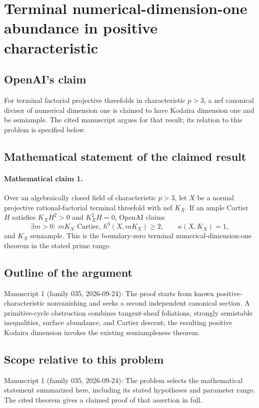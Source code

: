 \documentclass[11pt]{article}
\begin{document}
\section*{Terminal numerical-dimension-one abundance in positive characteristic}

\subsection{OpenAI's claim}
For terminal factorial projective threefolds in characteristic $p>3$, a nef canonical divisor of numerical dimension one is claimed to have Kodaira dimension one and be semiample. The cited manuscript argues for that result; its relation to this problem is specified below.

\subsection{Mathematical statement of the claimed result}
\paragraph{Mathematical claim 1.} Over an algebraically closed field of characteristic $p>3$, let $X$ be a normal projective rational-factorial terminal threefold with nef $K_X$. If an ample Cartier $H$ satisfies $K_XH^2>0$ and $K_X^2H=0$, OpenAI claims
\[
\exists m>0:\ mK_X\text{ Cartier},\ h^0(X,mK_X)\ge2,\qquad\kappa(X,K_X)=1,
\]
and $K_X$ semiample. This is the boundary-zero terminal numerical-dimension-one theorem in the stated prime range.

\subsection{Outline of the argument}
Manuscript 1 (family 035, 2026-09-24): The proof starts from known positive-characteristic nonvanishing and seeks a second independent canonical section. A primitive-cycle obstruction combines tangent-sheaf foliations, strongly semistable inequalities, surface abundance, and Cartier descent; the resulting positive Kodaira dimension invokes the existing semiampleness theorem.

\subsection{Scope relative to this problem}
Manuscript 1 (family 035, 2026-09-24): The problem selects the mathematical statement summarized here, including its stated hypotheses and parameter range. The cited theorem gives a claimed proof of that assertion in full.
\end{document}
